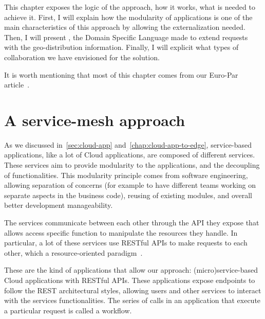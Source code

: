 This chapter exposes the logic of the approach, how it works, what is
needed to achieve it.
%
First, I will explain how the modularity of applications is one of the
main characteristics of this approach by allowing the externalization
needed.
%
Then, I will present \scl, the Domain Specific Language made to extend
requests with the geo-distribution information.
%
Finally, I will explicit what types of collaboration we have
envisioned for the solution.

It is worth mentioning that most of this chapter comes from our
Euro-Par article~\cite{CDL21}.


\section{A service-mesh approach}
\label{sec:service-mesh}


As we discussed in~\autoref{sec:cloud-app}
and~\autoref{chap:cloud-app-to-edge}, service-based applications, like
a lot of Cloud applications, are composed of different services.
%
These services aim to provide modularity to the applications, and the
decoupling of functionalities.
%
This modularity principle comes from software engineering, allowing
separation of concerns (for example to have different teams working on
separate aspects in the business code), reusing of existing modules,
and overall better development manageability.
%


The services communicate between each other through the \acrshort{API}
they expose that allows access specific function to manipulate the
resources they handle.
%
In particular, a lot of these services use RESTful APIs to make
requests to each other, which a resource-oriented
paradigm~\cite{RCDK08, AW10, HFKLV14}.

These are the kind of applications that allow our approach:
(micro)service-based Cloud applications with RESTful APIs.
%
These applications expose endpoints to follow the REST architectural
styles, allowing users and other services to interact with the
services functionalities.
%
The series of calls in an application that execute a particular
request is called a workflow.


